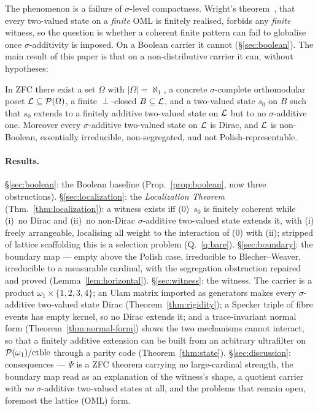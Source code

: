 The phenomenon is a failure of $\sigma$-level compactness. Wright's
theorem~\cite{Wright1978}, that every two-valued state on a \emph{finite} OML is
finitely realised, forbids any \emph{finite} witness, so the question is whether
a coherent finite pattern can fail to globalise once $\sigma$-additivity is imposed.
On a Boolean carrier it cannot (\S\ref{sec:boolean}). The main result of this
paper is that on a non-distributive carrier it can, without hypotheses:

\begin{theorem}\label{thm:main-intro}
In ZFC there exist a set $\Omega$ with $|\Omega|=\aleph_1$, a concrete
$\sigma$-complete orthomodular poset $\mathcal{L}\subseteq\mathcal{P}(\Omega)$, a finite
$\perp$-closed $B\subseteq\mathcal{L}$, and a two-valued state $s_0$ on $B$ such that
$s_0$ extends to a finitely additive two-valued state on $\mathcal{L}$ but to no
$\sigma$-additive one. Moreover every $\sigma$-additive two-valued state on
$\mathcal{L}$ is Dirac, and $\mathcal{L}$ is non-Boolean, essentially irreducible,
non-segregated, and not Polish-representable.
\end{theorem}

\paragraph{Results.}
\S\ref{sec:boolean}: the Boolean baseline (Prop.~\ref{prop:boolean}, now three
obstructions). \S\ref{sec:localization}: the \emph{Localization Theorem}
(Thm.~\ref{thm:localization}): a witness exists iff (0)~$s_0$ is finitely coherent
while (i)~no Dirac and (ii)~no non-Dirac $\sigma$-additive two-valued state extends
it, with (i) freely arrangeable, localising all weight to the interaction of (0)
with (ii); stripped of lattice scaffolding this is a selection problem
(Q.~\ref{q:bare}). \S\ref{sec:boundary}: the boundary map --- empty above the
Polish case, irreducible to Blecher--Weaver, irreducible to a measurable cardinal,
with the segregation obstruction repaired and proved
(Lemma~\ref{lem:horizontal}). \S\ref{sec:witness}: the witness. The carrier is a
product $\omega_1\times\{1,2,3,4\}$; an Ulam matrix imported as generators makes
every $\sigma$-additive two-valued state Dirac (Theorem~\ref{thm:rigidity}); a
Specker triple of fibre events has empty kernel, so no Dirac extends it; and a
trace-invariant normal form (Theorem~\ref{thm:normal-form}) shows the two
mechanisms cannot interact, so that a finitely additive extension can be built
from an arbitrary ultrafilter on $\mathcal{P}(\omega_1)/\mathrm{ctble}$ through a parity
code (Theorem~\ref{thm:state}). \S\ref{sec:discussion}: consequences --- $\Psi$
is a ZFC theorem carrying no large-cardinal strength, the boundary map read as an
explanation of the witness's shape, a quotient carrier with \emph{no}
$\sigma$-additive two-valued states at all, and the problems that remain open,
foremost the lattice (OML) form.


